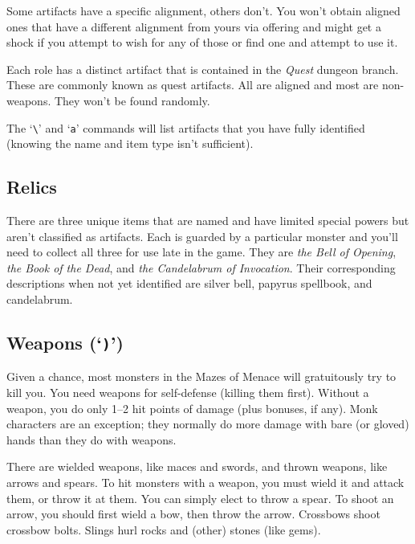 \documentclass[titlepage]{article}
\begin{document}
Some artifacts have a specific alignment, others don't.
You won't obtain aligned ones that have a different alignment from yours
via offering and might get a shock if you attempt to wish for any of those
or find one and attempt to use it.

Each role has a distinct artifact that is contained in the \textit{Quest}
dungeon branch.
These are commonly known as quest artifacts.
All are aligned and most are non-weapons.
They won't be found randomly.

The `\texttt{\textbackslash}' and `\texttt{\textasciigrave{}a}' commands will
list artifacts that you have fully identified (knowing the name and item
type isn't sufficient).

\subsection*{Relics}

There are three unique items that are named and have limited special
powers but aren't classified as artifacts.
Each is guarded by a particular monster and you'll need to collect all
three for use late in the game.
They are \textit{the Bell of Opening},
\textit{the Book of the Dead}, and
\textit{the Candelabrum of Invocation}.
Their corresponding descriptions when not yet identified are
silver bell, papyrus spellbook, and candelabrum.

\subsection*{Weapons (`\texttt{)}')}

Given a chance, most monsters in the Mazes of Menace will gratuitously try to
kill you.
You need weapons for self-defense (killing them first).
Without a
weapon, you do only 1--2 hit points of damage (plus bonuses, if any).
Monk characters are an exception; they normally do more damage with
bare (or gloved) hands than they do with weapons.

There are wielded weapons, like maces and swords, and thrown weapons,
like arrows and spears.  To hit monsters with a weapon, you must wield it and
attack them, or throw it at them.  You can simply elect to throw a spear.
To shoot an arrow, you should first wield a bow, then throw the arrow.
Crossbows shoot crossbow bolts.  Slings hurl rocks and (other) stones
(like gems).
\end{document}
